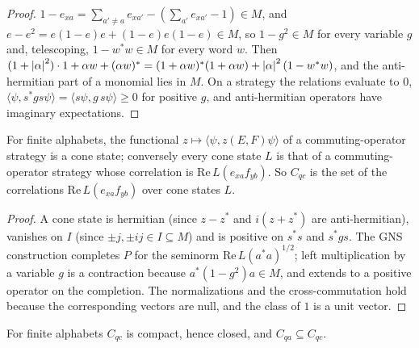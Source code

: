 \begin{proof}
\leanok
$1 - e_{xa} = \sum_{a' \neq a} e_{xa'} - (\sum_{a'} e_{xa'} - 1) \in M$, and
$e - e^2 = e(1 - e)e + (1 - e)e(1 - e) \in M$, so $1 - g^2 \in M$ for every variable $g$ and,
telescoping, $1 - w^* w \in M$ for every word $w$. Then
$(1 + \left\vert {\alpha} \right\vert^2) \cdot 1 + \alpha w + (\alpha w)^* = (1 + \alpha w)^*(1 + \alpha w) +
\left\vert {\alpha} \right\vert^2 (1 - w^* w)$, and the anti-hermitian part of a monomial lies in $M$. On a
strategy the relations evaluate to $0$, $\langle \psi, s^* g s \psi \rangle =
\langle s\psi, g\, s\psi \rangle \geq 0$ for positive $g$, and anti-hermitian operators have
imaginary expectations.
\end{proof}

\begin{lemma}
\label{lem:cone-state-gns}
\leanok
For finite alphabets, the functional $z \mapsto \langle \psi, z(E, F) \psi \rangle$ of a
commuting-operator strategy is a cone state; conversely every cone state $L$ is that of a
commuting-operator strategy whose correlation is $\mathrm{Re}\, L(e_{xa} f_{yb})$. So $C_{qc}$
is the set of the correlations $\mathrm{Re}\, L(e_{xa} f_{yb})$ over cone states $L$.
\end{lemma}

\begin{proof}
\leanok
A cone state is hermitian (since $z - z^*$ and $i(z + z^*)$ are anti-hermitian), vanishes on
$I$ (since $\pm j, \pm i j \in I \subseteq M$) and is positive on $s^* s$ and $s^* g s$. The
GNS construction completes $P$ for the seminorm $\mathrm{Re}\, L(a^* a)^{1/2}$; left
multiplication by a variable $g$ is a contraction because $a^*(1 - g^2) a \in M$, and extends
to a positive operator on the completion. The normalizations and the cross-commutation hold
because the corresponding vectors are null, and the class of $1$ is a unit vector.
\end{proof}

\begin{lemma}[$C_{qc}$ is compact]
\label{lem:cqc-compact}
\leanok
For finite alphabets $C_{qc}$ is compact, hence closed, and $C_{qa} \subseteq C_{qc}$.
\end{lemma}

